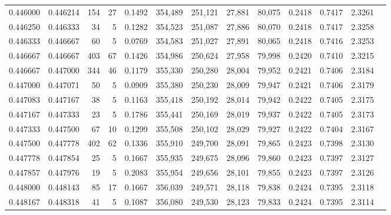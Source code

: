 \begin{tabular}{rrrrrrrrrrrrr}
0.446000 & 0.446214 &   154 &  27 &                                     0.1492 & 354,489 & 251,121 &  27,881 &  80,075 & 0.2418 & 0.7417 & 2.3261 \\
0.446250 & 0.446333 &    34 &   5 &                                     0.1282 & 354,523 & 251,087 &  27,886 &  80,070 & 0.2418 & 0.7417 & 2.3258 \\
0.446333 & 0.446667 &    60 &   5 &                                     0.0769 & 354,583 & 251,027 &  27,891 &  80,065 & 0.2418 & 0.7416 & 2.3253 \\
0.446667 & 0.446667 &   403 &  67 &                                     0.1426 & 354,986 & 250,624 &  27,958 &  79,998 & 0.2420 & 0.7410 & 2.3215 \\
0.446667 & 0.447000 &   344 &  46 &                                     0.1179 & 355,330 & 250,280 &  28,004 &  79,952 & 0.2421 & 0.7406 & 2.3184 \\
0.447000 & 0.447071 &    50 &   5 &                                     0.0909 & 355,380 & 250,230 &  28,009 &  79,947 & 0.2421 & 0.7406 & 2.3179 \\
0.447083 & 0.447167 &    38 &   5 &                                     0.1163 & 355,418 & 250,192 &  28,014 &  79,942 & 0.2422 & 0.7405 & 2.3175 \\
0.447167 & 0.447333 &    23 &   5 &                                     0.1786 & 355,441 & 250,169 &  28,019 &  79,937 & 0.2422 & 0.7405 & 2.3173 \\
0.447333 & 0.447500 &    67 &  10 &                                     0.1299 & 355,508 & 250,102 &  28,029 &  79,927 & 0.2422 & 0.7404 & 2.3167 \\
0.447500 & 0.447778 &   402 &  62 &                                     0.1336 & 355,910 & 249,700 &  28,091 &  79,865 & 0.2423 & 0.7398 & 2.3130 \\
0.447778 & 0.447854 &    25 &   5 &                                     0.1667 & 355,935 & 249,675 &  28,096 &  79,860 & 0.2423 & 0.7397 & 2.3127 \\
0.447857 & 0.447976 &    19 &   5 &                                     0.2083 & 355,954 & 249,656 &  28,101 &  79,855 & 0.2423 & 0.7397 & 2.3126 \\
0.448000 & 0.448143 &    85 &  17 &                                     0.1667 & 356,039 & 249,571 &  28,118 &  79,838 & 0.2424 & 0.7395 & 2.3118 \\
0.448167 & 0.448318 &    41 &   5 &                                     0.1087 & 356,080 & 249,530 &  28,123 &  79,833 & 0.2424 & 0.7395 & 2.3114 \\

\end{tabular}

